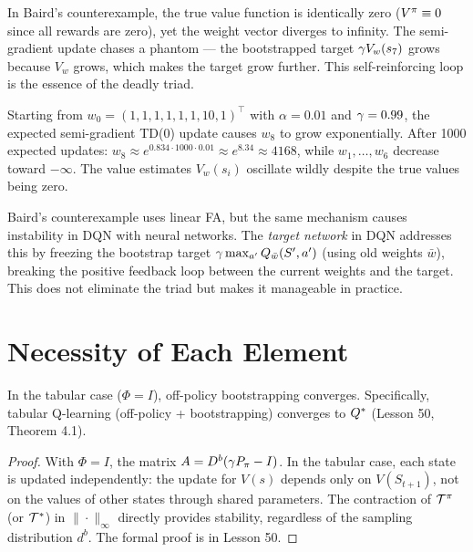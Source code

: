 \documentclass[11pt,a4paper]{article}
\begin{document}
\begin{warning}[title={Divergence Occurs Even with Zero Rewards}]
In Baird's counterexample, the true value function is identically zero
($V^\pi \equiv 0$ since all rewards are zero), yet the weight
vector diverges to infinity. The semi-gradient update chases a phantom
--- the bootstrapped target $\gamma V_w(s_7)$ grows because $V_w$
grows, which makes the target grow further. This self-reinforcing loop
is the essence of the deadly triad.
\end{warning}

\begin{example}
\label{ex:divergence_trace}
Starting from $w_0 = (1,1,1,1,1,1,10,1)^\top$ with $\alpha = 0.01$
and $\gamma = 0.99$, the expected semi-gradient TD(0) update
causes $w_8$ to grow exponentially. After 1000 expected updates:
$w_8 \approx e^{0.834 \cdot 1000 \cdot 0.01} \approx e^{8.34}
\approx 4168$, while $w_1, \ldots, w_6$ decrease toward
$-\infty$. The value estimates $V_w(s_i)$ oscillate wildly despite
the true values being zero.
\end{example}

\begin{rlconnection}[title={Baird's Counterexample and DQN}]
Baird's counterexample uses linear FA, but the same mechanism
causes instability in DQN with neural networks. The \emph{target
network} in DQN addresses this by freezing the bootstrap target
$\gamma \max_{a'} Q_{\bar{w}}(S', a')$ (using old weights
$\bar{w}$), breaking the positive feedback loop between the
current weights and the target. This does not eliminate the triad
but makes it manageable in practice.
\end{rlconnection}

\section{Necessity of Each Element}
\label{sec:necessity}

\begin{proposition}
\label{prop:no_fa}
In the tabular case ($\Phi = I$), off-policy bootstrapping
converges. Specifically, tabular Q-learning (off-policy +
bootstrapping) converges to $Q^*$ (Lesson 50, Theorem 4.1).
\end{proposition}

\begin{proof}
With $\Phi = I$, the matrix $A = D^b(\gamma P_\pi - I)$.
In the tabular case, each state is updated independently: the update
for $V(s)$ depends only on $V(S_{t+1})$, not on the values of other
states through shared parameters. The contraction of $\mathcal{T}^\pi$
(or $\mathcal{T}^*$) in $\|\cdot\|_\infty$ directly provides stability,
regardless of the sampling distribution $d^b$. The formal proof is
in Lesson 50.
\end{proof}
\end{document}
